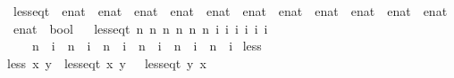 \begin{isabellebody}
\begin{isamarkuptext}
\end{isamarkuptext}\isamarkuptrue%
\isamarkupfalse%
\ less{\isacharunderscore}{\kern0pt}eq{\isacharunderscore}{\kern0pt}t\ {\isacharcolon}{\kern0pt}{\isacharcolon}{\kern0pt}\ {\isachardoublequoteopen}{\isacharparenleft}{\kern0pt}enat\ {\isasymtimes}\ enat\ {\isasymtimes}\ enat\ {\isasymtimes}\ enat\ {\isasymtimes}\ enat\ {\isasymtimes}\ enat{\isacharparenright}{\kern0pt}\ {\isasymRightarrow}\ {\isacharparenleft}{\kern0pt}enat\ {\isasymtimes}\ enat\ {\isasymtimes}\ enat\ {\isasymtimes}\ enat\ {\isasymtimes}\ enat\ {\isasymtimes}\ enat{\isacharparenright}{\kern0pt}\ {\isasymRightarrow}\ bool{\isachardoublequoteclose}\isanewline
\ \ \isanewline
{\isachardoublequoteopen}less{\isacharunderscore}{\kern0pt}eq{\isacharunderscore}{\kern0pt}t\ {\isacharparenleft}{\kern0pt}n{}{\isacharcomma}{\kern0pt}\ n{}{\isacharcomma}{\kern0pt}\ n{}{\isacharcomma}{\kern0pt}\ n{}{\isacharcomma}{\kern0pt}\ n{}{\isacharcomma}{\kern0pt}\ n{}{\isacharparenright}{\kern0pt}\ {\isacharparenleft}{\kern0pt}i{}{\isacharcomma}{\kern0pt}\ i{}{\isacharcomma}{\kern0pt}\ i{}{\isacharcomma}{\kern0pt}\ i{}{\isacharcomma}{\kern0pt}\ i{}{\isacharcomma}{\kern0pt}\ i{}{\isacharparenright}{\kern0pt}\ {\isacharequal}{\kern0pt}\isanewline
\ \ \ \ {\isacharparenleft}{\kern0pt}n{}\ {\isasymle}\ i{}\ {\isasymand}\ n{}\ {\isasymle}\ i{}\ {\isasymand}\ n{}\ {\isasymle}\ i{}\ {\isasymand}\ n{}\ {\isasymle}\ i{}\ {\isasymand}\ n{}\ {\isasymle}\ i{}\ {\isasymand}\ n{}\ {\isasymle}\ i{}{\isacharparenright}{\kern0pt}{\isachardoublequoteclose}\isanewline
\isanewline
{}\isamarkupfalse%
\ less\ \isanewline
{\isachardoublequoteopen}less\ x\ y\ {\isasymequiv}\ less{\isacharunderscore}{\kern0pt}eq{\isacharunderscore}{\kern0pt}t\ x\ y\ {\isasymand}\ {\isasymnot}\ {\isacharparenleft}{\kern0pt}less{\isacharunderscore}{\kern0pt}eq{\isacharunderscore}{\kern0pt}t\ y\ x{\isacharparenright}{\kern0pt}{\isachardoublequoteclose}\isanewline
%
\begin{isamarkuptext}%
\begin{figure}[t]
    \centering
\begin{multicols}{2}


\end{multicols}
\end{figure}
\end{isamarkuptext}
\end{isabellebody}
